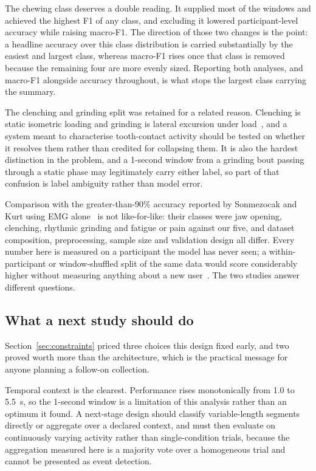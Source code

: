 \documentclass[pdflatex,sn-nature,iicol]{sn-jnl}
\begin{document}
The chewing class deserves a double reading. It supplied most of the windows and achieved the highest F1 of any class, and excluding it lowered participant-level accuracy while raising macro-F1. The direction of those two changes is the point: a headline accuracy over this class distribution is carried substantially by the easiest and largest class, whereas macro-F1 rises once that class is removed because the remaining four are more evenly sized. Reporting both analyses, and macro-F1 alongside accuracy throughout, is what stops the largest class carrying the summary.

The clenching and grinding split was retained for a related reason. Clenching is static isometric loading and grinding is lateral excursion under load~\cite{lan2022comparative}, and a system meant to characterise tooth-contact activity should be tested on whether it resolves them rather than credited for collapsing them. It is also the hardest distinction in the problem, and a 1-second window from a grinding bout passing through a static phase may legitimately carry either label, so part of that confusion is label ambiguity rather than model error.

Comparison with the greater-than-90\% accuracy reported by Sonmezocak and Kurt using EMG alone~\cite{sonmezocak2021detection} is not like-for-like: their classes were jaw opening, clenching, rhythmic grinding and fatigue or pain against our five, and dataset composition, preprocessing, sample size and validation design all differ. Every number here is measured on a participant the model has never seen; a within-participant or window-shuffled split of the same data would score considerably higher without measuring anything about a new user~\cite{saeb2017need,little2017using}. The two studies answer different questions.

\subsection{What a next study should do}

Section~\ref{sec:constraints} priced three choices this design fixed early, and two proved worth more than the architecture, which is the practical message for anyone planning a follow-on collection.

Temporal context is the clearest. Performance rises monotonically from 1.0 to 5.5~s, so the 1-second window is a limitation of this analysis rather than an optimum it found. A next-stage design should classify variable-length segments directly or aggregate over a declared context, and must then evaluate on continuously varying activity rather than single-condition trials, because the aggregation measured here is a majority vote over a homogeneous trial and cannot be presented as event detection.
\end{document}
